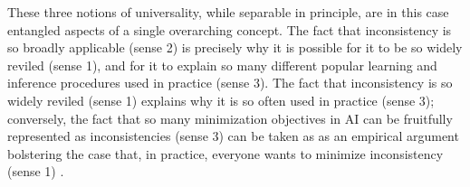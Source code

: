 \begin{enumerate}
%

\end{enumerate} 


These three notions of universality, while separable in principle, are in this case entangled aspects of a single overarching concept.
The fact that inconsistency is so broadly applicable (sense 2) is precisely why it is possible for it to be so widely reviled (sense 1), and for it to explain so many different popular learning and inference procedures used in practice (sense 3). 
The fact that inconsistency is so widely reviled (sense 1) explains why it is so often used in practice (sense 3);
conversely, the fact that so many minimization objectives in AI can be fruitfully represented as inconsistencies
(sense 3)
can be taken as as an empirical argument bolstering the case that, in practice, everyone wants to minimize inconsistency (sense 1)
\unskip. 
%

